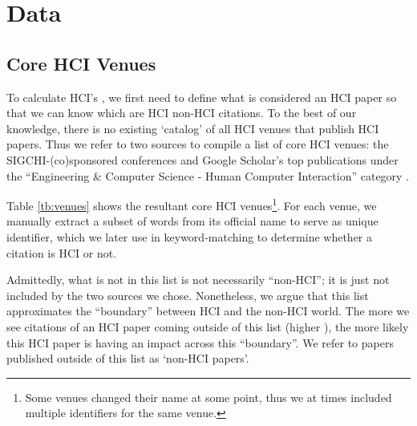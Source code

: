 \section{Data}

\subsection{Core HCI Venues}
% 
To calculate HCI's \xin, we first need to define what is considered an HCI paper so that we can know which are HCI \vs non-HCI citations.
To the best of our knowledge, there is no existing `catalog' of all HCI venues that publish HCI papers.
Thus we refer to two sources to compile a list of core HCI venues: the SIGCHI-(co)sponsored conferences \cite{Upcoming19:online} and Google Scholar's top publications under the ``Engineering \& Computer Science - Human Computer Interaction'' category \cite{HumanCom38:online}.

Table \ref{tb:venues} shows the resultant core HCI venues\footnote{Some venues changed their name at some point, thus we at times included multiple identifiers for the same venue.}. For each venue, we manually extract a subset of words from its official name to serve as unique identifier, which we later use in keyword-matching to determine whether a citation is HCI or not.

Admittedly, what is not in this list is not necessarily ``non-HCI''; it is just not included by the two sources we chose.
Nonetheless, we argue that this list approximates the ``boundary'' between HCI and the non-HCI world.
The more we see citations of an HCI paper coming outside of this list (\ie higher \xin), the more likely this HCI paper is having an impact across this ``boundary''.
We refer to papers published outside of this list as `non-HCI papers'.

